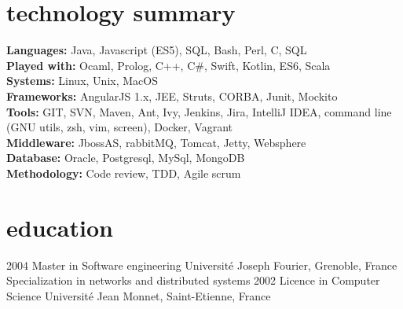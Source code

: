 \documentclass[]{k-cv} %
\begin{document}

\section{technology summary}

\begin{freetext}
{
\textbf{Languages:} Java, Javascript (ES5), SQL, Bash, Perl, C, SQL\\
\textbf{Played with:} Ocaml, Prolog, C++, C\#, Swift, Kotlin, ES6, Scala\\
\textbf{Systems:} Linux, Unix, MacOS\\
\textbf{Frameworks:} AngularJS 1.x, JEE, Struts, CORBA, Junit, Mockito\\
\textbf{Tools:} GIT, SVN, Maven, Ant, Ivy, Jenkins, Jira, IntelliJ IDEA, command line (GNU utils, zsh, vim, screen), Docker, Vagrant\\
\textbf{Middleware:} JbossAS, rabbitMQ, Tomcat, Jetty, Websphere\\
\textbf{Database:} Oracle, Postgresql, MySql, MongoDB\\
\textbf{Methodology:} Code review, TDD, Agile scrum\\
}
\end{freetext}

\section{education}

\begin{entrylist}
\entry
{2004}
{Master {\normalfont in Software engineering}}
{Universit\'{e} Joseph Fourier, Grenoble, France}
{Specialization in networks and distributed systems}
\entry
{2002}
{Licence {\normalfont in Computer Science}}
{Universit\'{e} Jean Monnet, Saint-Etienne, France}
{}
\end{entrylist}


\end{document}
